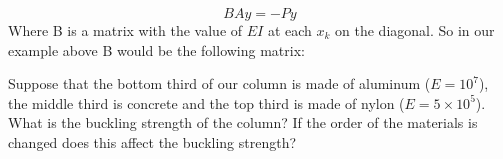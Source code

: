 \[
B A y = -Py
\]
Where B is a matrix with the value of $E I$ at each $x_k$ on the diagonal. So in our example above B would be the following matrix:


\begin{problem}
Suppose that the bottom third of our column is made of aluminum ($E = 10^7$), the middle third is concrete and the top third is made of nylon ($E = 5\times 10^5$). What is the buckling strength of the column? If the order of the materials is changed does this affect the buckling strength?
\end{problem}



